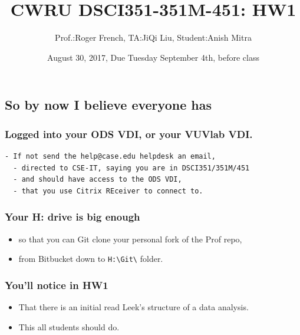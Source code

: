 \documentclass[]{article}
\title{CWRU DSCI351-351M-451: HW1}
\author{Prof.:Roger French, TA:JiQi Liu, Student:Anish Mitra}
\date{August 30, 2017, Due Tuesday September 4th, before class}
\providecommand{\tightlist}{%
  \setlength{\itemsep}{0pt}\setlength{\parskip}{0pt}}
\begin{document}
\maketitle

{
\hypersetup{linkcolor=black}
\setcounter{tocdepth}{2}
\tableofcontents
}
\setcounter{section}{1} \setcounter{subsection}{0}

\hypertarget{so-by-now-i-believe-everyone-has}{%
\subsection{So by now I believe everyone
has}\label{so-by-now-i-believe-everyone-has}}

\hypertarget{logged-into-your-ods-vdi-or-your-vuvlab-vdi.}{%
\subsubsection{Logged into your ODS VDI, or your VUVlab
VDI.}\label{logged-into-your-ods-vdi-or-your-vuvlab-vdi.}}

\begin{verbatim}
- If not send the help@case.edu helpdesk an email, 
  - directed to CSE-IT, saying you are in DSCI351/351M/451 
  - and should have access to the ODS VDI, 
  - that you use Citrix REceiver to connect to.
\end{verbatim}

\hypertarget{your-h-drive-is-big-enough}{%
\subsubsection{Your H: drive is big
enough}\label{your-h-drive-is-big-enough}}

\begin{itemize}
\tightlist
\item
  so that you can Git clone your personal fork of the Prof repo,
\item
  from Bitbucket down to \texttt{H:\textbackslash{}Git\textbackslash{}}
  folder.
\end{itemize}

\hypertarget{youll-notice-in-hw1}{%
\subsubsection{You'll notice in HW1}\label{youll-notice-in-hw1}}

\begin{itemize}
\tightlist
\item
  That there is an initial read Leek's structure of a data analysis.\\
\item
  This all students should do.
\end{itemize}
\end{document}
